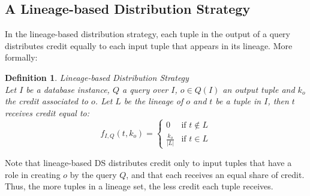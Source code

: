 \documentclass[preprint,12pt,sort&compress]{elsarticle}
\newtheorem{definition}{Definition}[section]
\newcommand{\eat}[1]{}
\begin{document}
\subsection{A Lineage-based Distribution Strategy}
In the lineage-based distribution strategy, each tuple in the output of a query distributes credit equally to each input tuple that appears in its lineage.  More formally:

\begin{definition}{Lineage-based Distribution Strategy}~\citep{dosso2020data}
    \label{def:lineage_ds}\\
    Let $I$ be a database instance, $Q$ a query over $I$, $o \in Q(I)$ an output tuple and $k_o$ the credit associated to $o$.
    Let $L$ be the lineage of $o$ and $t$ be a tuple in $I$, then $t$ receives credit equal to:
    \begin{equation*}
        f_{I, Q}(t, k_o) =  \begin{cases}
         0 & \mbox{if $t \notin L$} \\
            \frac{k_o}{|L|} & \mbox{if $t \in L$}
        \end{cases}
    \end{equation*}
\end{definition}

%

\eat{Definition~\ref{def:lineage_ds} 
defines how to distribute credit $k_o$ for one tuple of the output. Therefore, to perform credit distribution for the set of output tuples (i.e. the result of a query), it is first necessary to divide the quantity of credit $k$ associated with the query among tuples in the output, and then compute the credit distribution for each tuple.
For simplicity, in this paper we assume that each output tuple carries a credit of 1 ($k_o=1$). }
Note that lineage-based DS distributes credit only to input tuples that have a role in creating $o$ by the query $Q$, and that each receives an equal share of credit. Thus, the more tuples in a lineage set, the less credit each tuple receives. 
\end{document}
